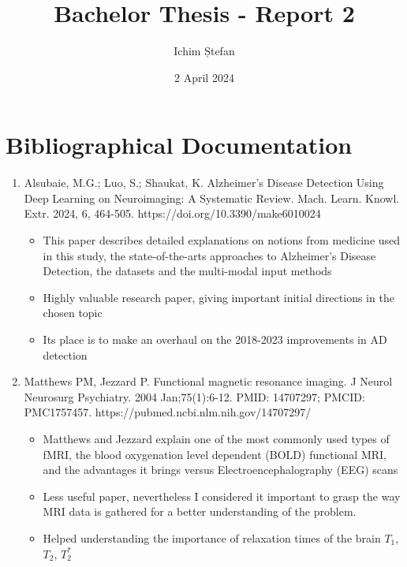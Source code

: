 \documentclass[a4paper]{article}
\title{
    Bachelor Thesis - Report 2
}
\author{Ichim Ștefan}
\date{2 April 2024}
\begin{document}
\maketitle

\newpage

\section*{Bibliographical Documentation}
\begin{enumerate}
      \item Alsubaie, M.G.; Luo, S.; Shaukat, K. Alzheimer's Disease Detection Using Deep Learning on Neuroimaging:
            A Systematic Review. Mach. Learn. Knowl. Extr. 2024, 6, 464-505. https://doi.org/10.3390/make6010024
            \begin{itemize}
                  \item This paper describes detailed explanations on notions from medicine used in this study,
                        the state-of-the-arts approaches to Alzheimer's Disease Detection, the datasets and the multi-modal
                        input methods
                  \item Highly valuable research paper, giving important initial directions in the chosen topic
                  \item Its place is to make an overhaul on the 2018-2023 improvements in AD detection
            \end{itemize}
      \item Matthews PM, Jezzard P. Functional magnetic resonance imaging. J Neurol Neurosurg Psychiatry.
            2004 Jan;75(1):6-12. PMID: 14707297; PMCID: PMC1757457. https://pubmed.ncbi.nlm.nih.gov/14707297/
            \begin{itemize}
                  \item Matthews and Jezzard explain one of the most commonly used types of fMRI, the
                        blood oxygenation level dependent (BOLD) functional MRI, and the advantages
                        it brings versus Electroencephalography (EEG) scans
                  \item Less useful paper, nevertheless I considered it important to grasp the way MRI data
                        is gathered for a better understanding of the problem.
                  \item Helped understanding the importance of relaxation times of the brain
                        $T_1$, $T_2$, $T_2^*$
            \end{itemize}

\end{enumerate}
\end{document}
